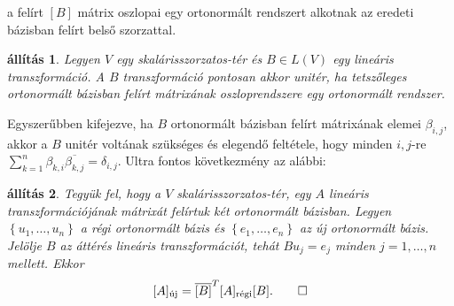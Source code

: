 \documentclass[9pt, a4paper, showtrims]{memoir}
\theoremstyle{plain}
\newtheorem{proposition}{állítás}[chapter]
\theoremstyle{remark}
\theoremstyle{definition}
\newcommand{\uj}{\text{új}}
\newcommand{\rgi}{\text{régi}}
\begin{document}
a felírt $[B]$ mátrix oszlopai egy ortonormált rendszert alkotnak az eredeti bázisban felírt belső szorzattal.
\begin{proposition}
    Legyen $V$ egy skalárisszorzatos-tér és $B\in L\left( V \right)$ egy lineáris transzformáció.
    A $B$ transzformáció pontosan akkor unitér,
    ha tetszőleges ortonormált bázisban felírt mátrixának oszloprendszere egy ortonormált rendszer.
\end{proposition}
Egyszerűbben kifejezve, ha $B$ ortonormált bázisban felírt mátrixának elemei $\beta_{i,j}$,
akkor a $B$ unitér voltának szükséges és elegendő feltétele, 
hogy minden $i,j$-re
$\sum_{k=1}^n\beta_{k,i}\overline{\beta_{k,j}}=\delta_{i,j}$.
Ultra fontos következmény az alábbi:
\begin{proposition}
    Tegyük fel, hogy a $V$ skalárisszorzatos-tér, egy $A$ lineáris transzformációjának mátrixát felírtuk
    két ortonormált bázisban.
    Legyen $\left\{ u_1,\dots,u_n \right\}$ a régi ortonormált bázis és $\left\{ e_1,\dots,e_n \right\}$ az új ortonormált bázis.
    Jelölje $B$ az áttérés lineáris transzformációt, tehát $Bu_j=e_j$ minden $j=1,\dots,n$ mellett.
    Ekkor
    \[
        [A]_\uj=\overline{[B]}^T[A]_{\rgi}[B].
        \qedhere
    \]
\end{proposition}
\end{document}
